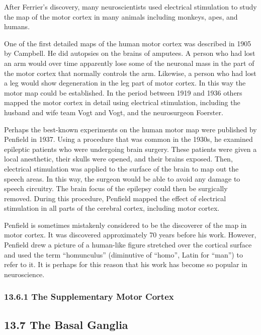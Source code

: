 After Ferrier's discovery, many neuroscientists used electrical
stimulation to study the map of the motor cortex in many animals
including monkeys, apes, and humans.

One of the first detailed maps of the human motor cortex was described
in 1905 by Campbell. He did autopsies on the brains of amputees. A
person who had lost an arm would over time apparently lose some of the
neuronal mass in the part of the motor cortex that normally controls the
arm. Likewise, a person who had lost a leg would show degeneration in
the leg part of motor cortex. In this way the motor map could be
established. In the period between 1919 and 1936 others mapped the motor
cortex in detail using electrical stimulation, including the husband and
wife team Vogt and Vogt, and the neurosurgeon Foerster.

Perhaps the best-known experiments on the human motor map were published
by Penfield in 1937. Using a procedure that was common in the 1930s, he
examined epileptic patients who were undergoing brain surgery. These
patients were given a local anesthetic, their skulls were opened, and
their brains exposed. Then, electrical stimulation was applied to the
surface of the brain to map out the speech areas. In this way, the
surgeon would be able to avoid any damage to speech circuitry. The brain
focus of the epilepsy could then be surgically removed. During this
procedure, Penfield mapped the effect of electrical stimulation in all
parts of the cerebral cortex, including motor cortex.

Penfield is sometimes mistakenly considered to be the discoverer of the
map in motor cortex. It was discovered approximately 70 years before his
work. However, Penfield drew a picture of a human-like figure stretched
over the cortical surface and used the term ``homunculus'' (diminutive
of ``homo'', Latin for ``man'') to refer to it. It is perhaps for this
reason that his work has become so popular in neuroscience.

\hypertarget{the-supplementary-motor-cortex}{%
\subsubsection{\texorpdfstring{{13.6.1} The Supplementary Motor
Cortex}{13.6.1 The Supplementary Motor Cortex}}\label{the-supplementary-motor-cortex}}

\hypertarget{the-basal-ganglia-1}{}
\hypertarget{the-basal-ganglia}{%
\subsection{\texorpdfstring{{13.7} The Basal
Ganglia}{13.7 The Basal Ganglia}}\label{the-basal-ganglia}}

